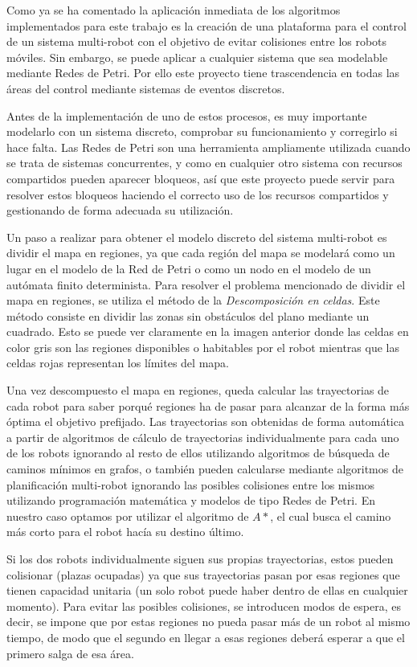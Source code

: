 Como ya se ha comentado la aplicación inmediata de los algoritmos implementados para este trabajo es la creación de una plataforma para el control de un sistema multi-robot con el objetivo de evitar colisiones entre los robots móviles. Sin embargo, se puede aplicar a cualquier sistema que sea modelable mediante Redes de Petri. Por ello este proyecto tiene trascendencia en todas las áreas del control mediante sistemas de eventos discretos.

Antes de la implementación de uno de estos procesos, es muy importante modelarlo con un sistema discreto, comprobar su funcionamiento y corregirlo si hace falta. Las Redes de Petri son una herramienta ampliamente utilizada cuando se trata de sistemas concurrentes, y como en cualquier otro sistema con recursos compartidos pueden aparecer bloqueos, así que este proyecto puede servir para resolver estos bloqueos haciendo el correcto uso de los recursos compartidos y gestionando de forma adecuada su utilización.

Un paso a realizar para obtener el modelo discreto del sistema multi-robot es dividir el mapa en regiones, ya que cada región del mapa se modelará como un lugar en el modelo de la Red de Petri o como un nodo en el modelo de un autómata finito determinista. Para resolver el problema mencionado de dividir el mapa en regiones, se utiliza el método de la \textit{Descomposición en celdas}. Este método consiste en dividir las zonas sin obstáculos del plano mediante un cuadrado. Esto se puede ver claramente en la imagen anterior donde las celdas en color gris son las regiones disponibles o habitables por el robot mientras que las celdas rojas representan los límites del mapa.

Una vez descompuesto el mapa en regiones, queda calcular las trayectorias de cada robot para saber porqué regiones ha de pasar para alcanzar de la forma más óptima el objetivo prefijado. Las trayectorias son obtenidas de forma automática a partir de algoritmos de cálculo de trayectorias individualmente para cada uno de los robots ignorando al resto de ellos utilizando algoritmos de búsqueda de caminos mínimos en grafos, o también pueden calcularse mediante algoritmos de planificación multi-robot ignorando las posibles colisiones entre los mismos utilizando programación matemática y modelos de tipo Redes de Petri. En nuestro caso optamos por utilizar el algoritmo de $A*$, el cual busca el camino más corto para el robot hacía su destino último.

Si los dos robots individualmente siguen sus propias trayectorias, estos pueden colisionar (plazas ocupadas) ya que sus trayectorias pasan por esas regiones que tienen capacidad unitaria (un solo robot puede haber dentro de ellas en cualquier momento). Para evitar las posibles colisiones, se introducen modos de espera, es decir, se impone que por estas regiones no pueda pasar más de un robot al mismo tiempo, de modo que el segundo en llegar a esas regiones deberá esperar a que el primero salga de esa área.

